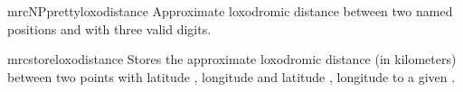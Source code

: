 \begin{docCommand}{mrcNPprettyloxodistance}{}
  Approximate loxodromic distance between two named positions
   and  with three valid digits.
  \begin{dispExample}
  \end{dispExample}
\end{docCommand}


\begin{docCommand}{mrcstoreloxodistance}{}
  Stores the approximate loxodromic distance (in kilometers) between two points
  with latitude , longitude 
  and latitude , longitude 
  to a given .
  \begin{dispExample}
  \mrcstoreloxodistance{}
  \mydist
  \end{dispExample}
\end{docCommand}

